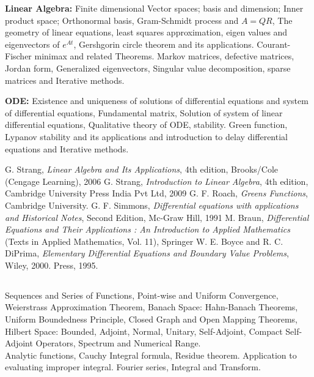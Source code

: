 \textbf{Linear Algebra:} Finite dimensional Vector spaces; basis and dimension; 
Inner product space; Orthonormal basis,  
Gram-Schmidt process and $A=QR$, The geometry of linear equations, least squares approximation, eigen values and eigenvectors of $e^{At}$, 
Gershgorin circle theorem and its applications. 
Courant-Fischer minimax and related Theorems. Markov matrices, defective matrices, Jordan form, Generalized eigenvectors, Singular value decomposition, sparse matrices and Iterative methods.


\textbf{ODE:}
Existence and uniqueness of solutions of differential equations and system of  differential equations, Fundamental matrix, Solution of system of linear differential equations, Qualitative theory of ODE, stability. Green function, Lypanov stability and its applications and introduction to delay differential equations and Iterative methods.



\begin{thebibliography}{99}
 G. Strang, \emph{Linear Algebra and Its Applications}, 4th edition, Brooks/Cole (Cengage Learning), 2006
 G. Strang, \emph{Introduction to Linear Algebra}, 4th edition, Cambridge University Press India Pvt Ltd, 2009
 G. F. Roach, \emph{Greens Functions}, Cambridge University.
     G. F. Simmons, \emph{Differential equations with applications and Historical Notes}, Second Edition, Mc-Graw Hill, 1991
             M. Braun, \emph{Differential Equations and Their Applications : An Introduction to Applied Mathematics} (Texts in Applied Mathematics, Vol. 11), Springer
             W. E. Boyce and R. C. DiPrima, \emph{Elementary Differential Equations and Boundary Value Problems}, Wiley, 2000.
Press, 1995.
\end{thebibliography}

\subsection{\courseinfo}
Sequences and Series of Functions, Point-wise and Uniform Convergence, Weierstrass Approximation Theorem, Banach Space: Hahn-Banach Theorems, Uniform Boundedness Principle, Closed Graph and Open Mapping Theorems, Hilbert Space: Bounded, Adjoint, Normal, Unitary, Self-Adjoint, Compact Self-Adjoint Operators, Spectrum and Numerical Range.\\
Analytic functions, Cauchy Integral formula, Residue theorem. Application to evaluating improper integral. Fourier series, Integral and Transform.


